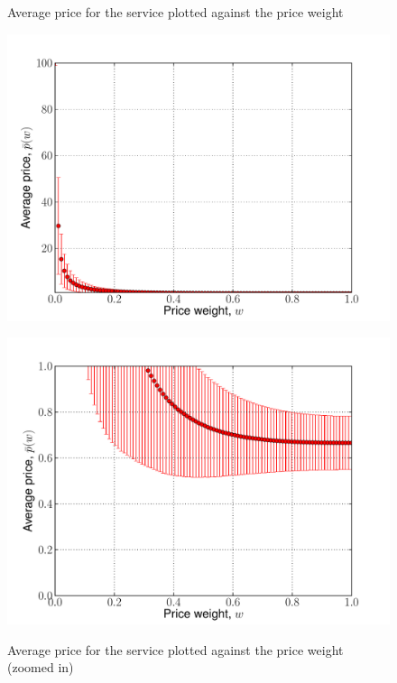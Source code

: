 \begin{figure}[tp!]
  \caption{Average price for the service plotted against the price weight}
  \includegraphics[width=\figsize]{2/Figures/expected_prices}
  \label{fig:expected_prices}
  \caption{Average price for the service plotted against the price weight (zoomed in)}
  \includegraphics[width=\figsize]{2/Figures/expected_prices_limited}
  \label{fig:expected_prices_limited}
\end{figure}

